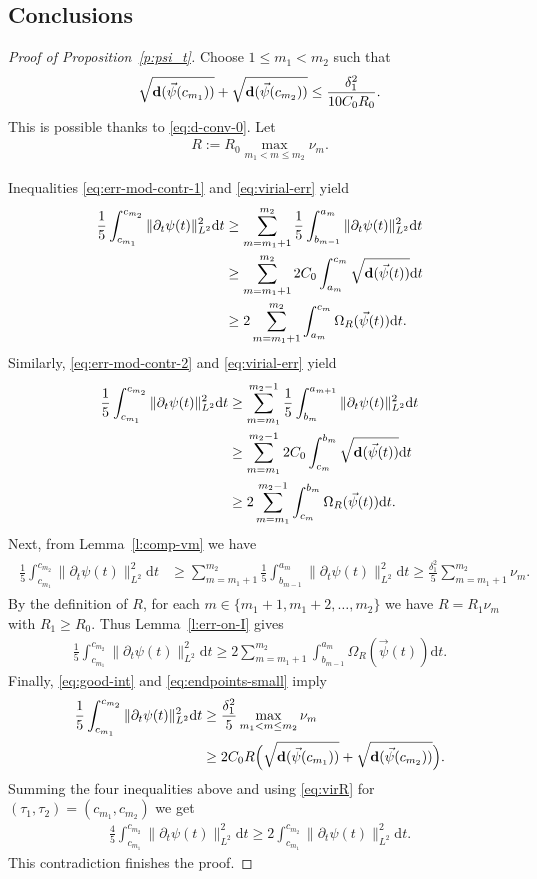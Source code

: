 \documentclass[10pt,reqno]{amsart}
\newcommand{\EQ}[1]{\begin{equation}\begin{split} #1 \end{split}\end{equation}}
\numberwithin{equation}{section}
\theoremstyle{remark}
\newcommand{\ud}{\mathrm{d}}
\newcommand{\0}{\emptyset}
\newcommand{\bfd}{{\bf d}}
\begin{document}
\subsection{Conclusions}
\begin{proof}[Proof of Proposition~\ref{p:psi_t}]
Choose $1\leq m_1 < m_2$ such that
\EQ{
\sqrt{\bfd(\vec\psi(c_{m_1}))} + \sqrt{\bfd(\vec\psi(c_{m_2}))} \leq \frac{\delta_1^2}{10C_0R_0}.
\label{eq:endpoints-small}
}
This is possible thanks to \eqref{eq:d-conv-0}.
Let
\EQ{
R := R_0 \max_{m_1 < m \leq m_2} \nu_m.
}

Inequalities \eqref{eq:err-mod-contr-1} and \eqref{eq:virial-err} yield
\EQ{
\begin{aligned}
\frac 15 \int_{c_{m_1}}^{c_{m_2}} \|\partial_t\psi(t)\|_{L^2}^2\ud t &\geq
\sum_{m = m_1+1}^{m_2}\frac 15\int_{b_{m-1}}^{a_m} \|\partial_t\psi(t)\|_{L^2}^2\ud t \\
&\geq \sum_{m=m_1+1}^{m_2}2C_0 \int_{a_m}^{c_m}\sqrt{\bfd(\vec\psi(t))}\ud t \\
&\geq 2\sum_{m=m_1+1}^{m_2}\int_{a_m}^{c_m}\Omega_R(\vec\psi(t))\ud t.
\end{aligned}
}
Similarly, \eqref{eq:err-mod-contr-2} and \eqref{eq:virial-err} yield
\EQ{
\begin{aligned}
\frac 15 \int_{c_{m_1}}^{c_{m_2}} \|\partial_t\psi(t)\|_{L^2}^2\ud t &\geq
\sum_{m = m_1}^{m_2-1}\frac 15\int_{b_{m}}^{a_{m+1}} \|\partial_t\psi(t)\|_{L^2}^2\ud t \\
&\geq \sum_{m=m_1}^{m_2-1}2C_0 \int_{c_m}^{b_m}\sqrt{\bfd(\vec\psi(t))}\ud t \\
&\geq 2\sum_{m=m_1}^{m_2-1}\int_{c_m}^{b_m}\Omega_R(\vec\psi(t))\ud t.
\end{aligned}
}
Next, from Lemma~\ref{l:comp-vm} we have
\EQ{ \label{eq:good-int}
\begin{aligned}
\frac 15 \int_{c_{m_1}}^{c_{m_2}} \|\partial_t\psi(t)\|_{L^2}^2\ud t &\geq
\sum_{m=m_1+1}^{m_2}\frac 15\int_{b_{m-1}}^{a_m}\|\partial_t\psi(t)\|_{L^2}^2\ud t
\geq \frac{\delta_1^2}{5}\sum_{m=m_1+1}^{m_2}\nu_m.
\end{aligned}
}
By the definition of $R$, for each $m \in \{m_1+1, m_1+2, \ldots, m_2\}$
we have $R = R_1\nu_m$ with $R_1 \geq R_0$. Thus Lemma~\ref{l:err-on-I} gives
\EQ{
\frac 15 \int_{c_{m_1}}^{c_{m_2}} \|\partial_t\psi(t)\|_{L^2}^2\ud t \geq 2\sum_{m=m_1+1}^{m_2}\int_{b_{m-1}}^{a_m}\Omega_R(\vec\psi(t))\ud t.
}
Finally, \eqref{eq:good-int} and \eqref{eq:endpoints-small} imply
\EQ{
\begin{aligned}
\frac 15 \int_{c_{m_1}}^{c_{m_2}} \|\partial_t\psi(t)\|_{L^2}^2\ud t &\geq \frac{\delta_1^2}{5}\max_{m_1 < m \leq m_2} \nu_m \\
&\geq 2C_0 R\Big(\sqrt{\bfd(\vec\psi(c_{m_1}))} + \sqrt{\bfd(\vec\psi(c_{m_2}))}\Big).
\end{aligned}
}
Summing the four inequalities above and using \eqref{eq:virR} for $(\tau_1, \tau_2) = (c_{m_1}, c_{m_2})$
we get
\EQ{
\frac 45 \int_{c_{m_1}}^{c_{m_2}} \|\partial_t\psi(t)\|_{L^2}^2\ud t \geq 2\int_{c_{m_1}}^{c_{m_2}} \|\partial_t\psi(t)\|_{L^2}^2\ud t.
}
This contradiction finishes the proof.
\end{proof}
\end{document}
